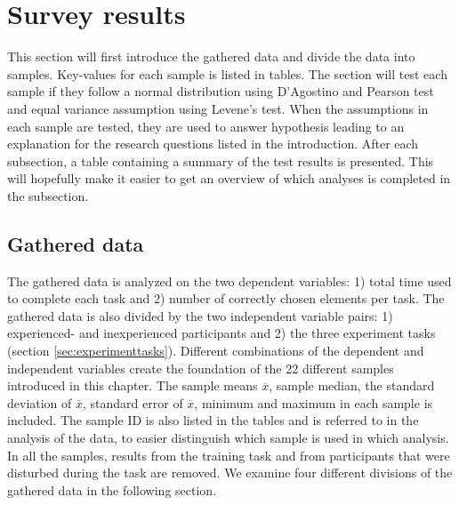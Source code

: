 \section{Survey results}\label{sec:survey_results}
This section will first introduce the gathered data and divide the data into samples. Key-values for each sample is listed in tables. The section will test each sample if they follow a normal distribution using D'Agostino and Pearson test and equal variance assumption using Levene's test. When the assumptions in each sample are tested, they are used to answer hypothesis leading to an explanation for the research questions listed in the introduction. After each subsection, a table containing a summary of the test results is presented. This will hopefully make it easier to get an overview of which analyses is completed in the subsection.   

\subsection{Gathered data}\label{sec:gathereddata}
The gathered data is analyzed on the two dependent variables: 1) total time used to complete each task and 2) number of correctly chosen elements per task. The gathered data is also divided by the two independent variable pairs: 1) experienced- and inexperienced participants and 2) the three experiment tasks (section \ref{sec:experimenttasks}). Different combinations of the dependent and independent variables create the foundation of the 22 different samples introduced in this chapter. The sample means $\overline{x}$, sample median, the standard deviation of $\overline{x}$, standard error of $\overline{x}$, minimum and maximum in each sample is included. The sample ID is also listed in the tables and is referred to in the analysis of the data, to easier distinguish which sample is used in which analysis. In all the samples, results from the training task and from participants that were disturbed during the task are removed. We examine four different divisions of the gathered data in the following section.

